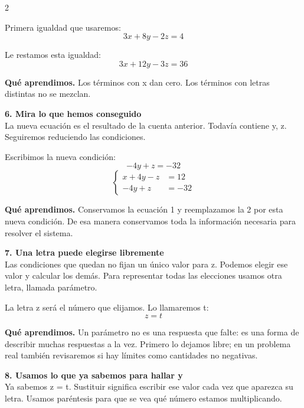 \documentclass[11pt,a4paper,landscape]{article}
\begin{document}
\begin{multicols*}{2}
\begin{minipage}{\linewidth}
\par\smallskip Primera igualdad que usaremos:
\[3x + 8y - 2z = 4\]
\par\smallskip Le restamos esta igualdad:
\[3x + 12y - 3z = 36\]
\par\smallskip\textbf{Qué aprendimos.} Los términos con x dan cero. Los términos con letras distintas no se mezclan.
\end{minipage}\par\medskip
\noindent\begin{minipage}{\linewidth}\textbf{6. Mira lo que hemos conseguido}\\[2pt]La nueva ecuación es el resultado de la cuenta anterior. Todavía contiene y, z. Seguiremos reduciendo las condiciones.
\par\smallskip Escribimos la nueva condición:
\[-4y + z = -32\]
\[\left\{\begin{aligned}x + 4y - z &= 12\\-4y + z &= -32\end{aligned}\right.\]
\par\smallskip\textbf{Qué aprendimos.} Conservamos la ecuación 1 y reemplazamos la 2 por esta nueva condición. De esa manera conservamos toda la información necesaria para resolver el sistema.
\end{minipage}\par\medskip
\noindent\begin{minipage}{\linewidth}\textbf{7. Una letra puede elegirse libremente}\\[2pt]Las condiciones que quedan no fijan un único valor para z. Podemos elegir ese valor y calcular los demás. Para representar todas las elecciones usamos otra letra, llamada parámetro.
\par\smallskip La letra z será el número que elijamos. Lo llamaremos t:
\[z=t\]
\par\smallskip\textbf{Qué aprendimos.} Un parámetro no es una respuesta que falte: es una forma de describir muchas respuestas a la vez. Primero lo dejamos libre; en un problema real también revisaremos si hay límites como cantidades no negativas.
\end{minipage}\par\medskip
\noindent\begin{minipage}{\linewidth}\textbf{8. Usamos lo que ya sabemos para hallar y}\\[2pt]Ya sabemos z = t. Sustituir significa escribir ese valor cada vez que aparezca su letra. Usamos paréntesis para que se vea qué número estamos multiplicando.

\end{minipage}
\end{multicols*}
\end{document}
